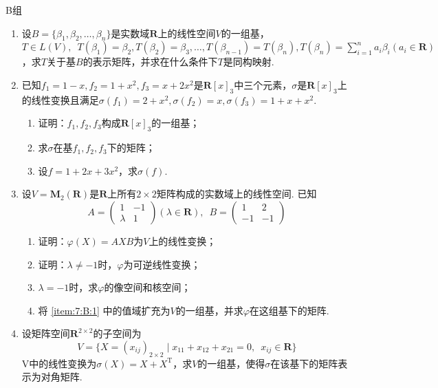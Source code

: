 \centerline{\heiti B组}
\begin{enumerate}
    \item 设$B=\{\beta_1,\beta_2,\ldots,\beta_n\}$是实数域$\mathbf{R}$上的线性空间$V$的一组基，$T \in L(V),\enspace T(\beta_1)=\beta_2,T(\beta_2)=\beta_3,\ldots,T(\beta_{n-1})=T(\beta_n),T(\beta_n)=\displaystyle\sum_{i=1}^{n}a_i\beta_i(a_i \in \mathbf{R})$，求$T$关于基$B$的表示矩阵，并求在什么条件下$T$是同构映射.

    \item 已知$f_1=1-x,f_2=1+x^2,f_3=x+2x^2$是$\mathbf{R}[x]_3$中三个元素，$\sigma$是$\mathbf{R}[x]_3$上的线性变换且满足$\sigma(f_1)=2+x^2,\sigma(f_2)=x,\sigma(f_3)=1+x+x^2$.
          \begin{enumerate}
              \item 证明：$f_1,f_2,f_3$构成$\mathbf{R}[x]_3$的一组基；

              \item 求$\sigma$在基$f_1,f_2,f_3$下的矩阵；

              \item 设$f=1+2x+3x^2$，求$\sigma(f)$.
          \end{enumerate}

    \item 设$V=\mathbf{M}_2(\mathbf{R})$是$\mathbf{R}$上所有$2 \times 2$矩阵构成的实数域上的线性空间. 已知
          \[A=\begin{pmatrix}1 & -1 \\ \lambda & 1 \end{pmatrix}(\lambda \in \mathbf{R}),\enspace B=\begin{pmatrix}1 & 2 \\ -1 & -1 \end{pmatrix}\]
          \begin{enumerate}
              \item 证明：$\varphi(X)=AXB$为$V$上的线性变换；

              \item 证明：$\lambda\neq-1$时，$\varphi$为可逆线性变换；

              \item \label{item:7:B:1}
                    $\lambda=-1$时，求$\varphi$的像空间和核空间；

              \item 将 \ref*{item:7:B:1} 中的值域扩充为$V$的一组基，并求$\varphi$在这组基下的矩阵.
          \end{enumerate}

    \item 设矩阵空间$\mathbf{R}^{2\times 2}$的子空间为
          \[V=\{X=(x_{ij})_{2\times 2} \mid x_{11}+x_{12}+x_{21}=0,\enspace x_{ij}\in \mathbf{R}\}\]
          V中的线性变换为$\sigma(X)=X+X^\mathrm{T}$，求$V$的一组基，使得$\sigma$在该基下的矩阵表示为对角矩阵.


\end{enumerate}

